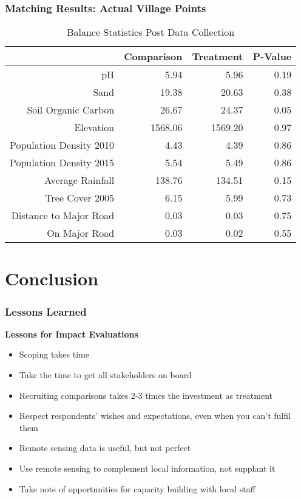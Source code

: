 \documentclass{beamer}
\begin{document}
\begin{frame}
\frametitle{Matching Results: Actual Village Points}

\begin{table}[ht]
\centering
\caption{Balance Statistics Post Data Collection} 
\begin{tabular}{rrrr}
  \hline
 & Comparison & Treatment & P-Value \\ 
  \hline
pH & 5.94 & 5.96 & 0.19 \\ 
  Sand & 19.38 & 20.63 & 0.38 \\ 
  Soil Organic Carbon & 26.67 & 24.37 & 0.05 \\ 
  Elevation & 1568.06 & 1569.20 & 0.97 \\ 
  Population Density 2010 & 4.43 & 4.39 & 0.86 \\ 
  Population Density 2015 & 5.54 & 5.49 & 0.86 \\ 
  Average Rainfall & 138.76 & 134.51 & 0.15 \\ 
  Tree Cover 2005 & 6.15 & 5.99 & 0.73 \\ 
  Distance to Major Road & 0.03 & 0.03 & 0.75 \\ 
  On Major Road & 0.03 & 0.02 & 0.55 \\ 
   \hline
\end{tabular}

\end{table}

\end{frame}


\section{Conclusion}

\begin{frame}
\frametitle{Lessons Learned}

\textbf{Lessons for Impact Evaluations}
\begin{itemize}
 \item Scoping takes time
 \item Take the time to get all stakeholders on board
 \item Recruiting comparisons takes 2-3 times the investment as treatment
 \item Respect respondents' wishes and expectations, even when you can't fulfil them
 \item Remote sensing data is useful, but not perfect
 \item Use remote sensing to complement local information, not supplant it
 \item Take note of opportunities for capacity building with local staff
\end{itemize}

\end{frame}
\end{document}
